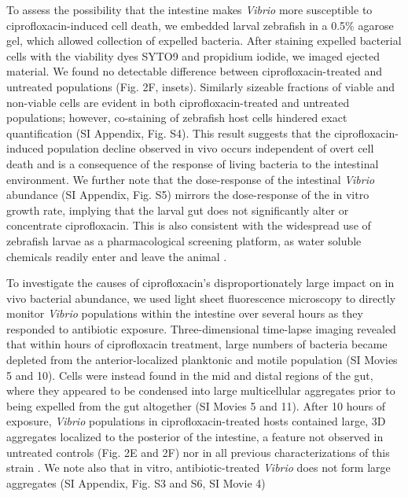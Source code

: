 To assess the possibility that the intestine makes \textit{Vibrio} more susceptible to ciprofloxacin-induced cell death, we embedded larval zebrafish in a 0.5\% agarose gel, which allowed collection of expelled bacteria. After staining expelled bacterial cells with the viability dyes SYTO9 and propidium iodide, we imaged ejected material. We found  no detectable difference between ciprofloxacin-treated and untreated populations (Fig. 2F, insets). Similarly sizeable fractions of viable and non-viable cells are evident in both ciprofloxacin-treated and untreated populations; however, co-staining of zebrafish host cells hindered exact quantification (SI Appendix, Fig. S4). This result suggests that the ciprofloxacin-induced population decline observed in vivo occurs independent of overt cell death and is a consequence of the response of living bacteria to the intestinal environment. We further note that the dose-response of the intestinal \textit{Vibrio} abundance (SI Appendix, Fig. S5) mirrors the dose-response of the in vitro growth rate, implying that the larval gut does not significantly alter or concentrate ciprofloxacin. This is also consistent with the widespread use of zebrafish larvae as a  pharmacological screening platform, as water soluble chemicals readily enter and leave the animal \cite{rennekamp201515,yoganantharjah2017use}.

To investigate the causes of ciprofloxacin's disproportionately large impact on in vivo bacterial abundance, we used light sheet fluorescence microscopy to directly monitor \textit{Vibrio} populations within the intestine over several hours as they responded to antibiotic exposure. Three-dimensional time-lapse imaging revealed that within hours of ciprofloxacin treatment, large numbers of bacteria became depleted from the anterior-localized planktonic and motile population (SI Movies 5 and 10). Cells were instead found in the mid and distal regions of the gut, where they appeared to be condensed into large multicellular aggregates prior to being expelled from the gut altogether (SI Movies 5 and 11). After 10 hours of exposure, \textit{Vibrio} populations in ciprofloxacin-treated hosts contained large, 3D aggregates localized to the posterior of the intestine, a feature not observed in untreated controls (Fig. 2E and 2F) nor in all previous characterizations of this strain \cite{Wiles2016,schlomann2018bacterial}. We note also that in vitro, antibiotic-treated \textit{Vibrio} does not form large aggregates (SI Appendix, Fig. S3 and S6, SI Movie 4)

